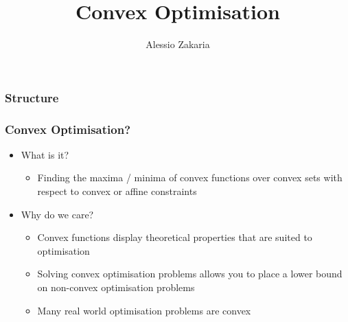 \documentclass{beamer}
\title{Convex Optimisation}
\author{Alessio Zakaria}
\date{}
\begin{document}
\begin{frame}
    \titlepage
\end{frame}

\begin{frame}
    \frametitle{Structure}
\end{frame}

\begin{frame}
    \frametitle{Convex Optimisation?}
    \begin{itemize}
    \item What is it?
        \begin{itemize}
        \item Finding the maxima / minima of convex functions over convex sets
        with respect to convex or affine constraints
        \end{itemize}
    \item Why do we care?
        \begin{itemize}
            \item Convex functions display theoretical properties that are
                suited to optimisation
            \item Solving convex optimisation problems allows you to place a lower bound
                on non-convex optimisation problems
            \item Many real world optimisation problems are convex
        \end{itemize}
    \end{itemize}
\end{frame}
\end{document}
